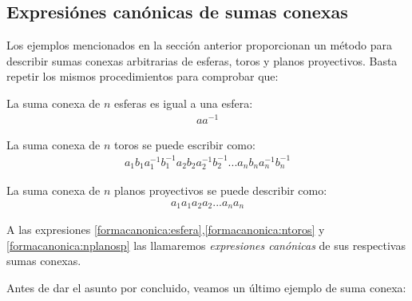 \documentclass[a4paper,11pt,spanish, twoside, leqno]{tfg-uam}
\theoremstyle{definition}
\begin{document}
\subsection{Expresiónes canónicas de sumas conexas}
\label{subsec:expresionescanonicassumasconexas}
Los ejemplos mencionados en la sección anterior proporcionan un método para describir sumas conexas arbitrarias de esferas, toros y planos proyectivos. Basta repetir los mismos procedimientos para comprobar que:

\begin{list}{-}{}
\item La suma conexa de $ n $ esferas es igual a una esfera:
\begin{align}\label{formacanonica:esfera}
	aa^{-1} 
\end{align}

	\item La suma conexa de $ n $ toros se puede escribir como:
\begin{align}\label{formacanonica:ntoros}
	a_1b_1a_1^{-1}b_1^{-1}a_2b_2a_2^{-1}b_2^{-1}...a_nb_na_n^{-1}b_n^{-1}
\end{align}

	\item La suma conexa de $ n $ planos proyectivos se puede describir como: 
\begin{align}\label{formacanonica:nplanosp}
a_1a_1a_2a_2...a_na_n
\end{align}
\end{list}
A las expresiones \ref{formacanonica:esfera},\ref{formacanonica:ntoros} y \ref{formacanonica:nplanosp} las llamaremos \textit{expresiones canónicas} de sus respectivas sumas conexas.
 
Antes de dar el asunto por concluido, veamos un último ejemplo de suma conexa:
\end{document}
